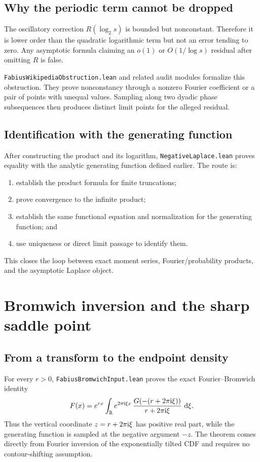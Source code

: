 \documentclass[11pt,oneside]{article}
\theoremstyle{definition}
\theoremstyle{remark}
\begin{document}
\subsection{Why the periodic term cannot be dropped}
The oscillatory correction \(R(\log_2s)\) is bounded but nonconstant.  Therefore it is lower order than the quadratic logarithmic term but not an error tending to zero.  Any asymptotic formula claiming an \(o(1)\) or \(O(1/\log s)\) residual after omitting \(R\) is false.

\nolinkurl{FabiusWikipediaObstruction.lean} and related audit modules formalize this obstruction.  They prove nonconstancy through a nonzero Fourier coefficient or a pair of points with unequal values.  Sampling along two dyadic phase subsequences then produces distinct limit points for the alleged residual.

\subsection{Identification with the generating function}
After constructing the product and its logarithm, \nolinkurl{NegativeLaplace.lean} proves equality with the analytic generating function defined earlier.  The route is:
\begin{enumerate}
  \item establish the product formula for finite truncations;
  \item prove convergence to the infinite product;
  \item establish the same functional equation and normalization for the generating function; and
  \item use uniqueness or direct limit passage to identify them.
\end{enumerate}
This closes the loop between exact moment series, Fourier/probability products, and the asymptotic Laplace object.

\section{Bromwich inversion and the sharp saddle point}\label{ch:saddle}

\subsection{From a transform to the endpoint density}
For every \(r>0\), \nolinkurl{FabiusBromwichInput.lean} proves the exact
Fourier--Bromwich identity
\[
 F(x)=e^{rx}\int_{\mathbb{R}}
 e^{2\pi\mathrm{i}\xi x}\,
 \frac{G\!\left(-(r+2\pi\mathrm{i}\xi)\right)}
      {r+2\pi\mathrm{i}\xi}\,\mathop{}\!\mathrm{d}\xi .
\]
Thus the vertical coordinate \(z=r+2\pi\mathrm{i}\xi\) has positive real part,
while the generating function is sampled at the negative argument \(-z\).
The theorem comes directly from Fourier inversion of the exponentially tilted
CDF and requires no contour-shifting assumption.
\end{document}
